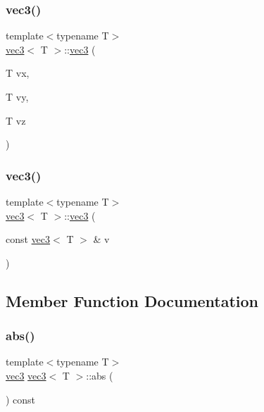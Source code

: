 \subsubsection{\texorpdfstring{vec3()}{vec3()}\hspace{0.1cm}{\footnotesize\ttfamily [2/3]}}
{\footnotesize\ttfamily template$<$typename T$>$ \\
\mbox{\hyperlink{structvec3}{vec3}}$<$ T $>$\+::\mbox{\hyperlink{structvec3}{vec3}} (\begin{DoxyParamCaption}\item[{T}]{vx,  }\item[{T}]{vy,  }\item[{T}]{vz }\end{DoxyParamCaption})\hspace{0.3cm}{\ttfamily [inline]}}

\mbox{\label{structvec3_ac0d73cf98ccc9b3cb39e6f58e92dab9f}} 
\subsubsection{\texorpdfstring{vec3()}{vec3()}\hspace{0.1cm}{\footnotesize\ttfamily [3/3]}}
{\footnotesize\ttfamily template$<$typename T$>$ \\
\mbox{\hyperlink{structvec3}{vec3}}$<$ T $>$\+::\mbox{\hyperlink{structvec3}{vec3}} (\begin{DoxyParamCaption}\item[{const \mbox{\hyperlink{structvec3}{vec3}}$<$ T $>$ \&}]{v }\end{DoxyParamCaption})\hspace{0.3cm}{\ttfamily [inline]}}



\subsection{Member Function Documentation}
\mbox{\label{structvec3_abf0d30ac0a81beeacd36ddc86ec6ee83}} 
\subsubsection{\texorpdfstring{abs()}{abs()}}
{\footnotesize\ttfamily template$<$typename T$>$ \\
\mbox{\hyperlink{structvec3}{vec3}} \mbox{\hyperlink{structvec3}{vec3}}$<$ T $>$\+::abs (\begin{DoxyParamCaption}{ }\end{DoxyParamCaption}) const\hspace{0.3cm}{\ttfamily [inline]}}



